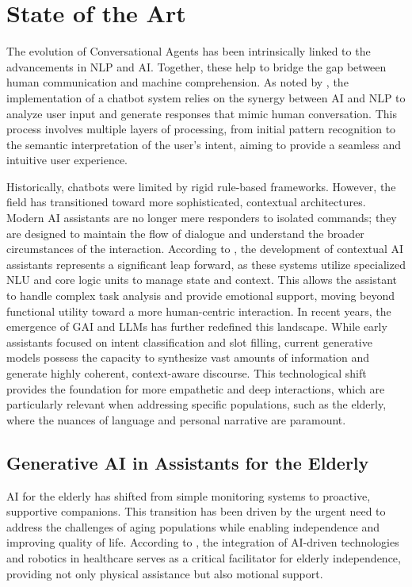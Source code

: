 \section{State of the Art}


The evolution of Conversational Agents has been intrinsically linked to the advancements in NLP and AI. Together, these help to bridge the gap between human communication and machine comprehension. As noted by \cite{Lalwani2018}, the implementation of a chatbot system relies on the synergy between AI and NLP to analyze user input and generate responses that mimic human conversation. This process involves multiple layers of processing, from initial pattern recognition to the semantic interpretation of the user's intent, aiming to provide a seamless and intuitive user experience.

Historically, chatbots were limited by rigid rule-based frameworks. However, the field has transitioned toward more sophisticated, contextual architectures. Modern AI assistants are no longer mere responders to isolated commands; they are designed to maintain the flow of dialogue and understand the broader circumstances of the interaction. According to \cite{9214076}, the development of contextual AI assistants represents a significant leap forward, as these systems utilize specialized NLU and core logic units to manage state and context. This allows the assistant to handle complex task analysis and provide 
emotional support, moving beyond functional utility toward a more human-centric interaction.
In recent years, the emergence of  GAI and LLMs has further redefined this landscape. While early assistants focused on intent classification and slot filling, current generative models possess the capacity to synthesize vast amounts of information and generate highly coherent, context-aware discourse. This technological shift provides the foundation for more empathetic and deep interactions, which are particularly relevant when addressing specific populations, such as the elderly, where the nuances of language and personal narrative are paramount.



    \subsection{Generative AI in Assistants for the Elderly}

AI for the elderly has shifted from simple monitoring systems to proactive, supportive companions. This transition has been driven by the urgent need to address the challenges of aging populations while enabling independence and improving quality of life. According to \cite{Padhan2023}, the integration of AI-driven technologies and robotics in healthcare serves as a critical facilitator for elderly independence, providing not only physical assistance but also 
motional support.

